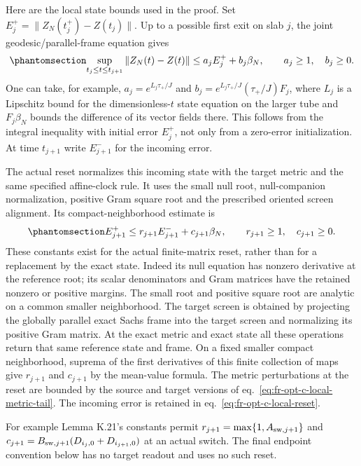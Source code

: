 \documentclass[
  english,
  11pt,
  reqno]{amsart}
\begin{document}
Here are the local state bounds used in the proof. Set
\(E_j^+=\|Z_N(t_j^+)-Z(t_j)\|\). Up to a possible first exit on slab
\(j\), the joint geodesic/parallel-frame equation gives
\begin{equation}\protect\phantomsection\label{eq:fr-opt-c-local-state-flow}{
 \sup_{t_j\le t\le t_{j+1}}
       \|Z_N(t)-Z(t)\|
 \le a_j E_j^+ +b_j\beta_N,
 \qquad a_j\ge1,\quad b_j\ge0.
}\end{equation} One can take, for example, \(a_j=e^{L_j\tau_+/J}\) and
\(b_j=e^{L_j\tau_+/J}(\tau_+/J)F_j\), where \(L_j\) is a Lipschitz bound
for the dimensionless-\(t\) state equation on the larger tube and
\(F_j\beta_N\) bounds the difference of its vector fields there. This
follows from the integral inequality with initial error \(E_j^+\), not
only from a zero-error initialization. At time \(t_{j+1}\) write
\(E_{j+1}^-\) for the incoming error.

The actual reset normalizes this incoming state with the target metric
and the same specified affine-clock rule. It uses the small null root,
null-companion normalization, positive Gram square root and the
prescribed oriented screen alignment. Its compact-neighborhood estimate
is
\begin{equation}\protect\phantomsection\label{eq:fr-opt-c-local-reset}{
 E_{j+1}^+\le r_{j+1}E_{j+1}^-+c_{j+1}\beta_N,
 \qquad r_{j+1}\ge1,\quad c_{j+1}\ge0.
}\end{equation} These constants exist for the actual finite-matrix
reset, rather than for a replacement by the exact state. Indeed its null
equation has nonzero derivative at the reference root; its scalar
denominators and Gram matrices have the retained nonzero or positive
margins. The small root and positive square root are analytic on a
common smaller neighborhood. The target screen is obtained by projecting
the globally parallel exact Sachs frame into the target screen and
normalizing its positive Gram matrix. At the exact metric and exact
state all these operations return that same reference state and frame.
On a fixed smaller compact neighborhood, suprema of the first
derivatives of this finite collection of maps give \(r_{j+1}\) and
\(c_{j+1}\) by the mean-value formula. The metric perturbations at the
reset are bounded by the source and target versions of
eq.~\ref{eq:fr-opt-c-local-metric-tail}. The incoming error is retained
in eq.~\ref{eq:fr-opt-c-local-reset}.

For example Lemma K.21's constants permit
\(r_{j+1}=\max\{1,A_{{\rm sw},j+1}\}\) and
\(c_{j+1}=B_{{\rm sw},j+1}(D_{i_j,0}+D_{i_{j+1},0})\) at an actual
switch. The final endpoint convention below has no target readout and
uses no such reset.
\end{document}
